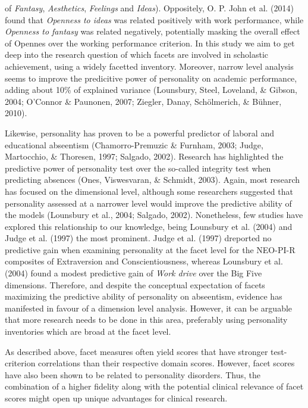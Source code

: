 \documentclass[,man,floatsintext]{apa6}
\begin{document}
of \emph{Fantasy}, \emph{Aesthetics}, \emph{Feelings} and \emph{Ideas}).
Oppositely, O. P. John et al. (2014) found that \emph{Openness to ideas}
was related positively with work performance, while \emph{Openness to
fantasy} was related negatively, potentially masking the overall effect
of Opennes over the working performance criterion. In this study we aim
to get deep into the research question of which facets are involved in
scholastic achievement, using a widely facetted inventory. Moreover,
narrow level analysis seems to improve the predicitive power of
personality on academic performance, adding about 10\% of explained
variance (Lounsbury, Steel, Loveland, \& Gibson, 2004; O'Connor \&
Paunonen, 2007; Ziegler, Danay, Schölmerich, \& Bühner, 2010).

Likewise, personality has proven to be a powerful predictor of laboral
and educational abseentism (Chamorro-Premuzic \& Furnham, 2003; Judge,
Martocchio, \& Thoresen, 1997; Salgado, 2002). Research has highlighted
the predictive power of personality test over the so-called integrity
test when predicting absences (Ones, Viswesvaran, \& Schmidt, 2003).
Again, most research has focused on the dimensional level, although some
researchers suggested that personality assessed at a narrower level
would improve the predictive ability of the models (Lounsbury et al.,
2004; Salgado, 2002). Nonetheless, few studies have explored this
relationship to our knowledge, being Lounsbury et al. (2004) and Judge
et al. (1997) the most prominent. Judge et al. (1997) dreported no
predictive gain when examining personality at the facet level for the
NEO-PI-R composites of Extraversion and Conscientiousness, whereas
Lounsbury et al. (2004) found a modest predictive gain of \emph{Work
drive} over the Big Five dimensions. Therefore, and despite the
conceptual expectation of facets maximizing the predictive ability of
personality on abseentism, evidence has manifested in favour of a
dimension level analysis. However, it can be arguable that more research
needs to be done in this area, preferably using personality inventories
which are broad at the facet level.

As described above, facet measures often yield scores that have stronger
test-criterion correlations than their respective domain scores.
However, facet scores have also been shown to be related to personality
disorders. Thus, the combination of a higher fidelity along with the
potential clinical relevance of facet scores might open up unique
advantages for clinical research.
\end{document}
